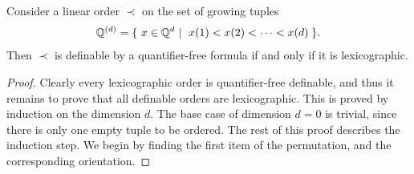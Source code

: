 \newcommand{\rattuples}[1]{\Rat^{(#1)}}
    \begin{theorem}\label{thm:lexicographic-order-on-rationals}
        Consider a linear order   $\prec$ on the set of growing tuples
                \begin{align*}
\rattuples d = \setbuild { x \in \Rat^d }{$x(1) < x(2) < \cdots < x(d)$}.
\end{align*}
Then $\prec$ is definable by a quantifier-free formula if and only if it is lexicographic. 
    \end{theorem}
\begin{proof}
        Clearly every lexicographic order is quantifier-free definable, and thus it remains to prove that all definable orders are lexicographic. This is proved by induction on the dimension $d$. The base case of dimension $d=0$ is trivial, since there is only one empty tuple to be ordered. The rest of this proof describes the induction step.   We begin by finding the first item of the permutation, and the corresponding orientation.


\end{proof}
